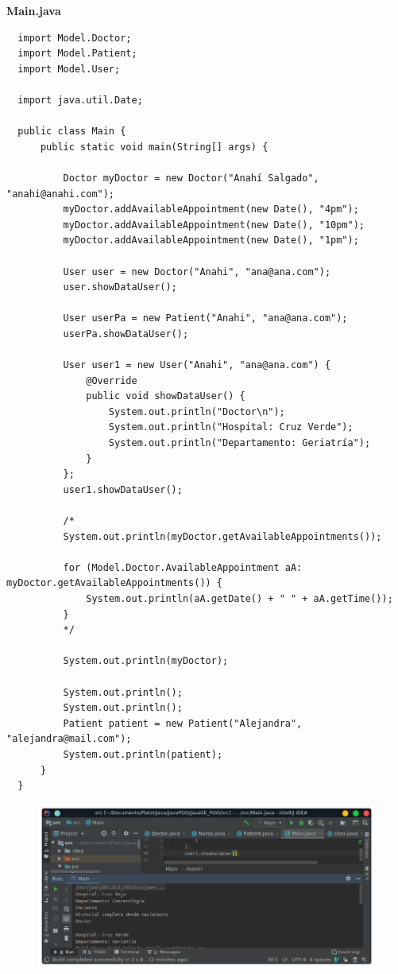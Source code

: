\documentclass{article}
\begin{document}
\textbf{Main.java}
\begin{verbatim}
  import Model.Doctor;
  import Model.Patient;
  import Model.User;

  import java.util.Date;

  public class Main {
      public static void main(String[] args) {

          Doctor myDoctor = new Doctor("Anahí Salgado", "anahi@anahi.com");
          myDoctor.addAvailableAppointment(new Date(), "4pm");
          myDoctor.addAvailableAppointment(new Date(), "10pm");
          myDoctor.addAvailableAppointment(new Date(), "1pm");

          User user = new Doctor("Anahi", "ana@ana.com");
          user.showDataUser();

          User userPa = new Patient("Anahi", "ana@ana.com");
          userPa.showDataUser();

          User user1 = new User("Anahi", "ana@ana.com") {
              @Override
              public void showDataUser() {
                  System.out.println("Doctor\n");
                  System.out.println("Hospital: Cruz Verde");
                  System.out.println("Departamento: Geriatría");
              }
          };
          user1.showDataUser();

          /*
          System.out.println(myDoctor.getAvailableAppointments());

          for (Model.Doctor.AvailableAppointment aA: myDoctor.getAvailableAppointments()) {
              System.out.println(aA.getDate() + " " + aA.getTime());
          }
          */

          System.out.println(myDoctor);

          System.out.println();
          System.out.println();
          Patient patient = new Patient("Alejandra", "alejandra@mail.com");
          System.out.println(patient);
      }
  }
\end{verbatim}

\begin{figure}[h!]
  \centering
  \includegraphics[scale=0.5]{./Pictures/051_clase_anonima.png}
\end{figure}
\end{document}
